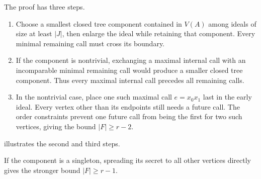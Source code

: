 \documentclass[USenglish, a4paper, thm-restate,numberwithinsect, cleveref]{lipics-v2021}
\begin{document}
The proof has three steps.
\begin{enumerate}
\item Choose a smallest closed tree component contained in $V(A)$
among ideals of size at least $|J|$, then enlarge the ideal while retaining that component.
Every minimal remaining call must cross its boundary.
\item If the component is nontrivial, exchanging a maximal internal
call with an incomparable minimal remaining call would produce a
smaller closed tree component. Thus every maximal internal call
precedes all remaining calls.
\item In the nontrivial case, place one such maximal call $e=x_0x_1$
last in the early ideal.
Every vertex other than its endpoints still needs a future call.
The order constraints prevent one future call from being the first
for two such vertices, giving the bound $|F|\ge r-2$.
\end{enumerate}
 illustrates the second and third steps.

If the component is a singleton, spreading its secret to all other
vertices directly gives the stronger bound $|F|\ge r-1$.
\end{document}
